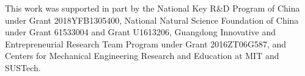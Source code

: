 \documentclass[twocolumn,cleanfoot,10pt]{asme2ej}
\begin{document}
\begin{acknowledgment}
This work was supported in part by the National Key R\&D Program of China under Grant 2018YFB1305400, National Natural Science Foundation of China under Grant 61533004 and Grant U1613206, Guangdong Innovative and Entrepreneurial Research Team Program under Grant 2016ZT06G587, and Centers for Mechanical Engineering Research and Education at MIT and SUSTech.
\end{acknowledgment}

%



%


\clearpage
\listoffigures
\clearpage
\listoftables
\end{document}
